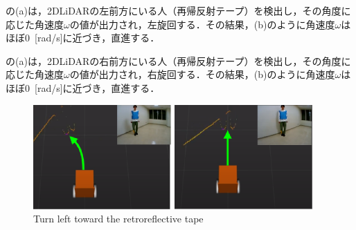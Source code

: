   の(a)は，2DLiDARの左前方にいる人（再帰反射テープ）を検出し，その角度に応じた角速度$\omega$の値が出力され，左旋回する．その結果，(b)のように角速度$\omega$はほぼ0 \,[rad/s]に近づき，直進する．

  の(a)は，2DLiDARの右前方にいる人（再帰反射テープ）を検出し，その角度に応じた角速度$\omega$の値が出力され，右旋回する．その結果，(b)のように角速度$\omega$はほぼ0 \,[rad/s]に近づき，直進する．

\begin{figure}[h]
  \centering
  \begin{minipage}[c]{65mm} 
      \centering
      \includegraphics[height=40mm]{images/eps/RobotGuidance_learning_turn_left_(a)}
  \end{minipage}
  \begin{minipage}[c]{65mm} 
      \centering
      \includegraphics[height=40mm]{images/eps/RobotGuidance_learning_turn_left_(b)}
  \end{minipage}
  \caption{Turn left toward the retroreflective tape}
  \label{Fig:RobotGuidance_learning_turn_left}
\end{figure}

